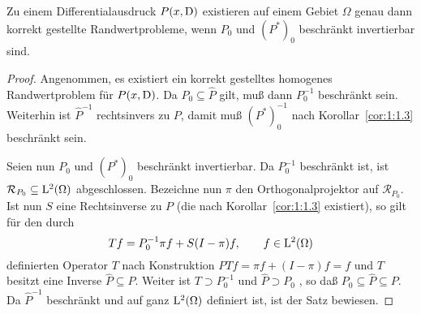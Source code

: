 \begin{thm}[Vi\v{s}ik, [{\cite[Theorem~1.2]{Hormander:1955}}]
Zu einem Differentialausdruck $P(x,\mathrm D)$ existieren auf einem Gebiet $\Omega$ genau dann korrekt gestellte Randwertprobleme, wenn $P_0$ und $(P^*)_0$
beschr\"ankt invertierbar sind.
\end{thm} 
\begin{proof} 
Angenommen, es existiert ein korrekt gestelltes homogenes Randwertproblem  für $P(x,\mathrm D)$. Da $P_0\subseteq \widehat P$ gilt, muß dann $P_0^{-1}$ beschränkt sein. Weiterhin ist $\widehat P^{-1}$ rechtsinvers zu $P$, damit muß $(P^*)_0^{-1}$ nach Korollar~\ref{cor:1:1.3} beschränkt sein.

Seien nun $P_0$ und $ (P^*)_0$ beschränkt invertierbar. Da $P_0^{-1}$ beschr\"ankt ist, ist $\mathcal R_{P_0}\subseteq \mathrm L^2(\Omega)$ abgeschlossen.  Bezeichne nun $\pi$ den Orthogonalprojektor auf $\mathcal R_{P_0}$. Ist nun $S$ eine Rechtsinverse zu $P$ (die nach  Korollar~\ref{cor:1:1.3} existiert), so gilt für
den durch  
\begin{equation}
  Tf = P_0^{-1} \pi f + S(I-\pi) f,\qquad f\in\mathrm L^2(\Omega) 
\end{equation}
definierten Operator $T$ nach Konstruktion $PT f = \pi f + (I-\pi) f = f$ und $T$ besitzt eine Inverse $\widehat P \subseteq P$. Weiter ist $T\supset P_0^{-1}$ und $\widehat P\supset P_0$ , so daß $P_0\subseteq \widehat P\subseteq P$. Da $\widehat P^{-1}$ beschränkt und auf ganz $\mathrm L^2(\Omega)$ definiert ist, ist der Satz bewiesen.
\end{proof}

